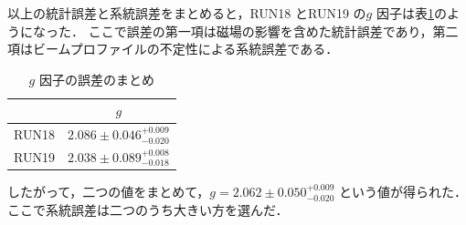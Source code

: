 以上の統計誤差と系統誤差をまとめると，RUN18 とRUN19 の$g$ 因子は表\ref{tab:NaIggosamatome}のようになった．
ここで誤差の第一項は磁場の影響を含めた統計誤差であり，第二項はビームプロファイルの不定性による系統誤差である．

\begin{table}[H]%
\caption{$g$ 因子の誤差のまとめ}
\centering
\begingroup
\renewcommand{\arraystretch}{1.2}%
\begin{tabular}{cc}\toprule
{} &   $g$  \\ \midrule
RUN18 & $2.086 \pm 0.046^{+0.009}_{-0.020} $  \\
RUN19 & $2.038 \pm 0.089^{+0.008}_{-0.018} $  \\ \bottomrule
\end{tabular}\label{tab:NaIggosamatome}
\endgroup
\end{table}

したがって，二つの値をまとめて，$g = 2.062 \pm 0.050^{+0.009}_{-0.020}$ という値が得られた．ここで系統誤差は二つのうち大きい方を選んだ．

%
